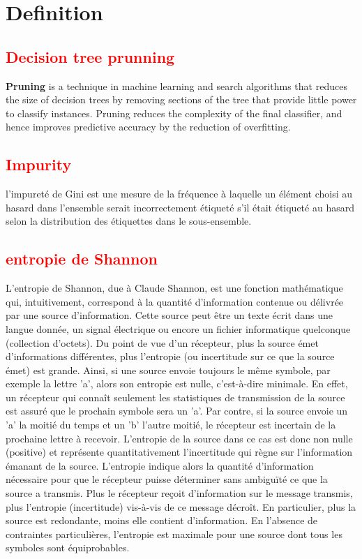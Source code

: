 \section{Definition}
\subsection{\textcolor{red}{Decision tree prunning}}
\textbf{Pruning} is a technique in machine learning and search algorithms that reduces the size of decision trees by removing sections of the tree that provide little power to classify instances. Pruning reduces the complexity of the final classifier, and hence improves predictive accuracy by the reduction of overfitting.
\subsection{\textcolor{red}{Impurity}}
l'impureté de Gini est une mesure de la fréquence à laquelle un élément choisi au hasard dans l'ensemble serait incorrectement étiqueté s'il était étiqueté au hasard selon la distribution des étiquettes dans le sous-ensemble. 

\subsection{\textcolor{red}{entropie de Shannon}}
L'entropie de Shannon, due à Claude Shannon, est une fonction mathématique qui, intuitivement, correspond à la quantité d'information contenue ou délivrée par une source d'information. Cette source peut être un texte écrit dans une langue donnée, un signal électrique ou encore un fichier informatique quelconque (collection d'octets).
Du point de vue d'un récepteur, plus la source émet d'informations différentes, plus l'entropie (ou incertitude sur ce que la source émet) est grande. Ainsi, si une source envoie toujours le même symbole, par exemple la lettre 'a', alors son entropie est nulle, c'est-à-dire minimale. En effet, un récepteur qui connaît seulement les statistiques de transmission de la source est assuré que le prochain symbole sera un 'a'. Par contre, si la source envoie un 'a' la moitié du temps et un 'b' l'autre moitié, le récepteur est incertain de la prochaine lettre à recevoir. L'entropie de la source dans ce cas est donc non nulle (positive) et représente quantitativement l'incertitude qui règne sur l'information émanant de la source. L'entropie indique alors la quantité d'information nécessaire pour que le récepteur puisse déterminer sans ambiguïté ce que la source a transmis. Plus le récepteur reçoit d'information sur le message transmis, plus l'entropie (incertitude) vis-à-vis de ce message décroît. En particulier, plus la source est redondante, moins elle contient d'information. En l'absence de contraintes particulières, l'entropie est maximale pour une source dont tous les symboles sont équiprobables.
